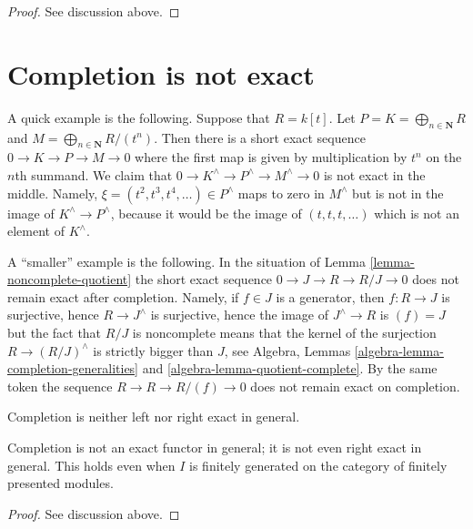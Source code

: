 \begin{proof}
See discussion above.
\end{proof}



\section{Completion is not exact}
\label{section-completion-not-exact}

\noindent
A quick example is the following. Suppose that $R = k[t]$. Let
$P = K = \bigoplus_{n \in \mathbf{N}} R$ and
$M = \bigoplus_{n \in \mathbf{N}} R/(t^n)$. Then there is a short exact
sequence $0 \to K \to P \to M \to 0$ where the first map is given by
multiplication by $t^n$ on the $n$th summand. We claim that
$0 \to K^\wedge \to P^\wedge \to M^\wedge \to 0$ is not exact in the middle.
Namely, $\xi = (t^2, t^3, t^4, \ldots) \in P^\wedge$ maps to zero in
$M^\wedge$ but is not in the image of $K^\wedge \to P^\wedge$, because
it would be the image of $(t, t, t, \ldots)$ which is not an element of
$K^\wedge$.

\medskip\noindent
A ``smaller'' example is the following. In the situation of
Lemma \ref{lemma-noncomplete-quotient}
the short exact sequence $0 \to J \to R \to R/J \to 0$ does not remain
exact after completion. Namely, if $f \in J$ is a generator, then
$f : R \to J$ is surjective, hence $R \to J^\wedge$ is surjective, hence
the image of $J^\wedge \to R$ is $(f) = J$ but the fact that
$R/J$ is noncomplete means that the kernel of the surjection
$R \to (R/J)^\wedge$ is strictly bigger than $J$, see
Algebra, Lemmas \ref{algebra-lemma-completion-generalities} and
\ref{algebra-lemma-quotient-complete}.
By the same token the sequence
$R \to R \to R/(f) \to 0$ does not remain exact on completion.

\begin{lemma}
\label{lemma-completion-not-exact}
\begin{slogan}
Completion is neither left nor right exact in general.
\end{slogan}
Completion is not an exact functor in general; it is not even
right exact in general. This holds even when $I$ is finitely
generated on the category of finitely presented modules.
\end{lemma}

\begin{proof}
See discussion above.
\end{proof}



